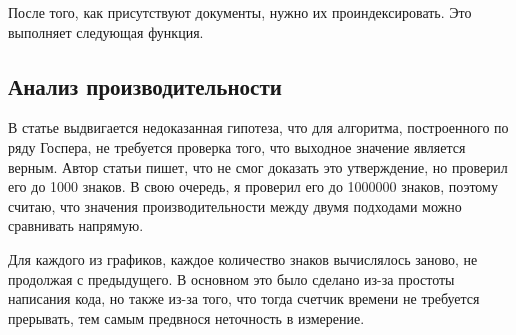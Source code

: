 \documentclass[a4page]{article}
\let\Oldsubsection\subsection
\renewcommand{\subsection}{\FloatBarrier\Oldsubsection}
\begin{document}
После того, как присутствуют документы, нужно их проиндексировать. Это выполняет следующая функция.



\subsection{Анализ производительности}

В статье \cite{spigot-unbounded} выдвигается недоказанная гипотеза, что для алгоритма, построенного по ряду Госпера, не требуется проверка того, что выходное значение является верным. Автор статьи пишет, что не смог доказать это утверждение, но проверил его до 1000 знаков. В свою очередь, я проверил его до 1000000 знаков, поэтому считаю, что значения производительности между двумя подходами можно сравнивать напрямую.

Для каждого из графиков, каждое количество знаков \tpi{} вычислялось заново, не продолжая с предыдущего. В основном это было сделано из-за простоты написания кода, но также из-за того, что тогда счетчик времени не требуется прерывать, тем самым предвнося неточность в измерение.
\end{document}
